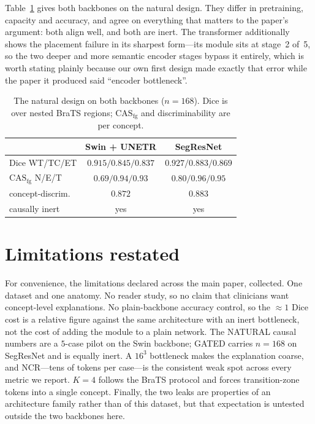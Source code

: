 \documentclass[10pt,twocolumn,letterpaper]{article}
\newcommand{\casfg}{\mathrm{CAS}_{\mathrm{fg}}}
\begin{document}
Table~\ref{tab:backbones} gives both backbones on the natural design. They differ in
pretraining, capacity and accuracy, and agree on everything that matters to the paper's
argument: both align well, and both are inert. The transformer additionally shows the
placement failure in its sharpest form---its module sits at stage~2 of~5, so the two deeper
and more semantic encoder stages bypass it entirely, which is worth stating plainly because
our own first design made exactly that error while the paper it produced said ``encoder
bottleneck''.

\begin{table}[t]\centering\footnotesize
\setlength{\tabcolsep}{4pt}
\caption{The natural design on both backbones ($n{=}168$). Dice is over nested BraTS
regions; $\casfg$ and discriminability are per concept.}
\label{tab:backbones}
\begin{tabular}{lcc}
\toprule
& Swin + UNETR & SegResNet \\
\midrule
Dice WT/TC/ET       & $0.915/0.845/0.837$ & $0.927/0.883/0.869$ \\
$\casfg$ N/E/T      & $0.69/0.94/0.93$    & $0.80/0.96/0.95$ \\
concept-discrim.    & $0.872$             & $0.883$ \\
causally inert      & yes                 & yes \\
\bottomrule
\end{tabular}
\end{table}

\section{Limitations restated}
\label{sec:limits}

For convenience, the limitations declared across the main paper, collected. One dataset and
one anatomy. No reader study, so no claim that clinicians want concept-level explanations.
No plain-backbone accuracy control, so the ${\approx}1$ Dice cost is a relative figure
against the same architecture with an inert bottleneck, not the cost of adding the module to
a plain network. The NATURAL causal numbers are a $5$-case pilot on the Swin backbone; GATED
carries $n{=}168$ on SegResNet and is equally inert. A $16^3$ bottleneck makes the
explanation coarse, and NCR---tens of tokens per case---is the consistent weak spot across
every metric we report. $K{=}4$ follows the BraTS protocol and forces transition-zone tokens
into a single concept. Finally, the two leaks are properties of an architecture family
rather than of this dataset, but that expectation is untested outside the two backbones here.
\end{document}
